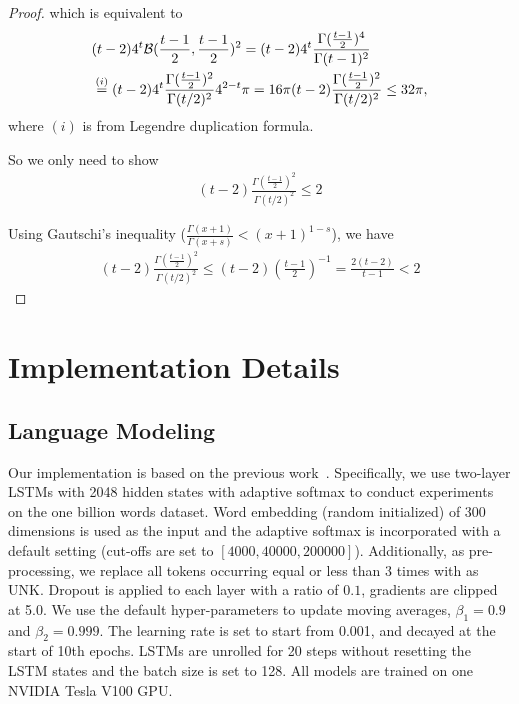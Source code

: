 \begin{proof}
which is equivalent to  
\begin{align*}
&(t-2) 4^t \mathcal{B}(\frac{t-1}{2},\frac{t-1}{2})^2
= (t-2) 4^t \frac{\Gamma(\frac{t-1}{2})^4}{\Gamma(t-1)^2}
\\ &\stackrel{(i)}{=} (t-2) 4^t \frac{\Gamma(\frac{t-1}{2})^2}{\Gamma(t/2)^2} 4^{2-t} \pi = 16 \pi (t-2)  \frac{\Gamma(\frac{t-1}{2})^2}{\Gamma(t/2)^2} \leq 32 \pi,
\end{align*}
where $(i)$ is from Legendre duplication formula.

So we only need to show 
\begin{align}
(t-2)  \frac{\Gamma(\frac{t-1}{2})^2}{\Gamma(t/2)^2} \leq 2
\end{align}

Using Gautschi's inequality ($\frac{\Gamma(x+1)}{\Gamma(x+s)} < (x+1)^{1-s}$), we have 
\begin{align}
(t-2)  \frac{\Gamma(\frac{t-1}{2})^2}{\Gamma(t/2)^2}  \leq (t-2) (\frac{t-1}{2})^{-1} = \frac{2(t-2)}{t-1} < 2
\end{align}
\end{proof}

\section{Implementation Details} \label{app:implement}
\subsection{Language Modeling}
Our implementation is based on the previous work~\citep{liu2018efficient}.
Specifically, we use two-layer LSTMs with 2048 hidden states with adaptive softmax to conduct experiments on the one billion words dataset.
Word embedding (random initialized) of 300 dimensions is used as the input and the adaptive softmax is incorporated with a default setting (cut-offs are set to $[4000,40000,200000]$). 
Additionally, as pre-processing, we replace all tokens occurring equal or less than 3 times with as UNK. 
Dropout is applied to each layer with a ratio of $0.1$, gradients are clipped at 5.0.
We use the default hyper-parameters to update moving averages, \ie $\beta_1=0.9$ and $\beta_2=0.999$.
The learning rate is set to start from 0.001, and decayed at the start of 10th epochs. 
LSTMs are unrolled for 20 steps without resetting the LSTM states and the batch size is set to 128.
All models are trained on one NVIDIA Tesla V100 GPU. 

